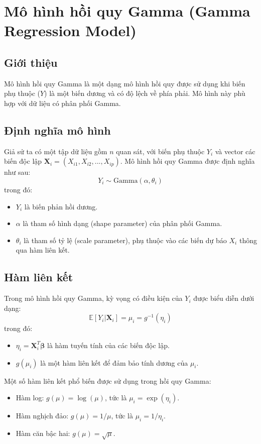 \chapter{Mô hình hồi quy Gamma (Gamma Regression Model)}
\section{Giới thiệu}
Mô hình hồi quy Gamma là một dạng mô hình hồi quy được sử dụng khi biến phụ thuộc ($Y$) là một biến dương và có độ lệch về phía phải. Mô hình này phù hợp với dữ liệu có phân phối Gamma.

\section{Định nghĩa mô hình}
Giả sử ta có một tập dữ liệu gồm $n$ quan sát, với biến phụ thuộc $Y_i$ và vector các biến độc lập $\mathbf{X}_i = (X_{i1}, X_{i2}, ..., X_{ip})$. Mô hình hồi quy Gamma được định nghĩa như sau:
\begin{equation}
    Y_i \sim \text{Gamma}(\alpha, \theta_i)
\end{equation}
trong đó:
\begin{itemize}
    \item $Y_i$ là biến phản hồi dương.
    \item $\alpha$ là tham số hình dạng (shape parameter) của phân phối Gamma.
    \item $\theta_i$ là tham số tỷ lệ (scale parameter), phụ thuộc vào các biến dự báo $X_i$ thông qua hàm liên kết.
\end{itemize}

\section{Hàm liên kết}
Trong mô hình hồi quy Gamma, kỳ vọng có điều kiện của $Y_i$ được biểu diễn dưới dạng:
\begin{equation}
    \mathbb{E}[Y_i | \mathbf{X}_i] = \mu_i = g^{-1}(\eta_i)
\end{equation}
trong đó:
\begin{itemize}
    \item $\eta_i = \mathbf{X}_i^T \boldsymbol{\beta}$ là hàm tuyến tính của các biến độc lập.
    \item $g(\mu_i)$ là một hàm liên kết để đảm bảo tính dương của $\mu_i$.
\end{itemize}

Một số hàm liên kết phổ biến được sử dụng trong hồi quy Gamma:
\begin{itemize}
    \item Hàm log: $g(\mu) = \log(\mu)$, tức là $\mu_i = \exp(\eta_i)$.
    \item Hàm nghịch đảo: $g(\mu) = 1/\mu$, tức là $\mu_i = 1/\eta_i$.
    \item Hàm căn bậc hai: $g(\mu) = \sqrt{\mu}$.
\end{itemize}

